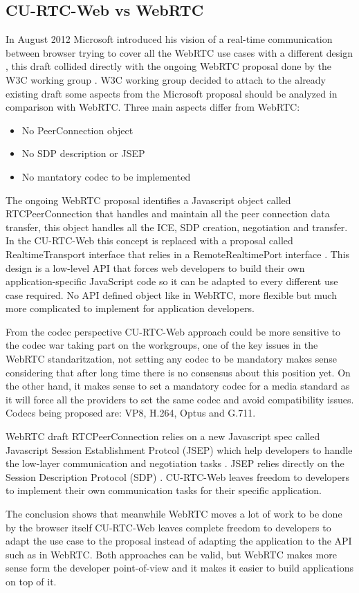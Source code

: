 \subsection{CU-RTC-Web vs WebRTC}
In August 2012 Microsoft introduced his vision of a real-time communication between browser trying to cover all the WebRTC use cases with a different design \cite{curtcweb}, this draft collided directly with the ongoing WebRTC proposal done by the W3C working group \cite{webrtcW3cgroup}. W3C working group decided to attach to the already existing draft some aspects from the Microsoft proposal should be analyzed in comparison with WebRTC. Three main aspects differ from WebRTC:
\begin{itemize}
	\item No PeerConnection object
	\item No SDP description or JSEP
	\item No mantatory codec to be implemented
\end{itemize}
The ongoing WebRTC proposal identifies a Javascript object called RTCPeerConnection that handles and maintain all the peer connection data transfer, this object handles all the ICE, SDP creation, negotiation and transfer. In the CU-RTC-Web this concept is replaced with a proposal called RealtimeTransport interface that relies in a RemoteRealtimePort interface \cite{realtimemedia}. This design is a low-level API that forces web developers to build their own application-specific JavaScript code so it can be adapted to every different use case required. No API defined object like in WebRTC, more flexible but much more complicated to implement for application developers.

From the codec perspective CU-RTC-Web approach could be more sensitive to the codec war taking part on the workgroups, one of the key issues in the WebRTC standaritzation, not setting any codec to be mandatory makes sense considering that after long time there is no consensus about this position yet. On the other hand, it makes sense to set a mandatory codec for a media standard as it will force all the providers to set the same codec and avoid compatibility issues. Codecs being proposed are: VP8, H.264, Optus and G.711.

WebRTC draft RTCPeerConnection relies on a new Javascript spec called Javascript Session Establishment Protcol (JSEP) which help developers to handle the low-layer communication and negotiation tasks \cite{jsepIETF}. JSEP relies directly on the Session Description Protocol (SDP) \cite{sdpIETF}. CU-RTC-Web leaves freedom to developers to implement their own communication tasks for their specific application.

The conclusion shows that meanwhile WebRTC moves a lot of work to be done by the browser itself CU-RTC-Web leaves complete freedom to developers to adapt the use case to the proposal instead of adapting the application to the API such as in WebRTC. Both approaches can be valid, but WebRTC makes more sense form the developer point-of-view and it makes it easier to build applications on top of it.

